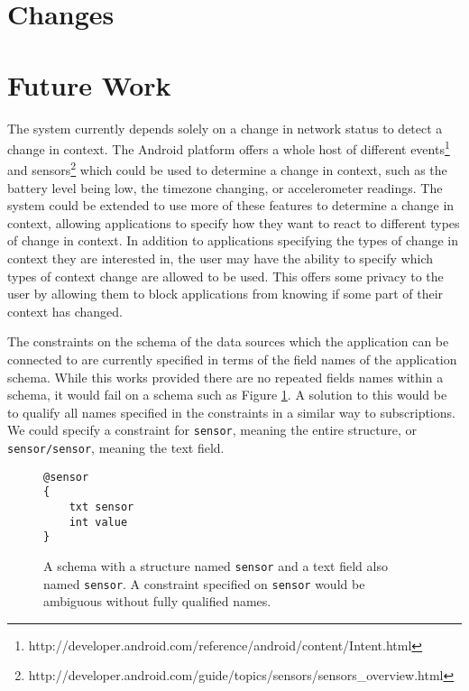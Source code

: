 \documentclass[12pt,twoside,notitlepage]{report}
\begin{document}
\section{Changes}


\section{Future Work}

The system currently depends solely on a change in network status to detect a change in context. 
The Android platform offers a whole host of different events\footnote{http://developer.android.com/reference/android/content/Intent.html} and sensors\footnote{http://developer.android.com/guide/topics/sensors/sensors\_overview.html} which could be used to determine a change in context, such as the battery level being low, the timezone changing, or accelerometer readings. 
The system could be extended to use more of these features to determine a change in context, allowing applications to specify how they want to react to different types of change in context. 
In addition to applications specifying the types of change in context they are interested in, the user may have the ability to specify which types of context change are allowed to be used. 
This offers some privacy to the user by allowing them to block applications from knowing if some part of their context has changed.

The constraints on the schema of the data sources which the application can be connected to are currently specified in terms of the field names of the application schema. 
While this works provided there are no repeated fields names within a schema, it would fail on a schema such as Figure \ref{fig:repeatednameschema}. 
A solution to this would be to qualify all names specified in the constraints in a similar way to subscriptions. 
We could specify a constraint for {\tt sensor}, meaning the entire structure, or {\tt sensor/sensor}, meaning the text field.

\begin{figure}[h]
\begin{lstlisting}
@sensor
{
	txt sensor
	int value
}
\end{lstlisting}
\caption[Schema with repeated name]{A schema with a structure named {\tt sensor} and a text field also named {\tt sensor}. A constraint specified on {\tt sensor} would be ambiguous without fully qualified names.}
\label{fig:repeatednameschema}
\end{figure}
\end{document}
